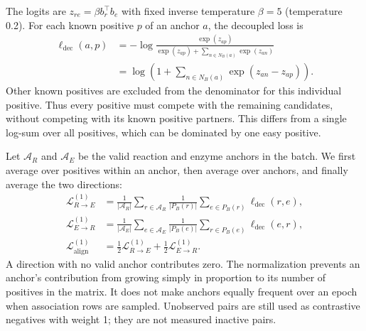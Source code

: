 The logits are $z_{re}=\beta b_r^\top b_e$ with fixed inverse temperature
$\beta=5$ (temperature 0.2). For each known positive $p$ of an anchor $a$, the
decoupled loss is
\begin{align}
  \ell_{\mathrm{dec}}(a,p)
   &=-\log\frac{\exp(z_{ap})}
       {\exp(z_{ap})+\sum_{n\in N_B(a)}\exp(z_{an})}\\
   &=\log\left(1+\sum_{n\in N_B(a)}\exp(z_{an}-z_{ap})\right).
   \label{eq:v4-decoupled}
\end{align}
Other known positives are excluded from the denominator for this individual
positive. Thus every positive must compete with the remaining candidates,
without competing with its known positive partners. This differs from a
single log-sum over all positives, which can be dominated by one easy positive.

Let $\mathcal A_R$ and $\mathcal A_E$ be the valid reaction and enzyme anchors
in the batch. We first average over positives within an anchor, then average
over anchors, and finally average the two directions:
\begin{align}
  \mathcal L_{R\to E}^{(1)}
    &=\frac{1}{|\mathcal A_R|}\sum_{r\in\mathcal A_R}
      \frac{1}{|P_B(r)|}\sum_{e\in P_B(r)}\ell_{\mathrm{dec}}(r,e),\\
  \mathcal L_{E\to R}^{(1)}
    &=\frac{1}{|\mathcal A_E|}\sum_{e\in\mathcal A_E}
      \frac{1}{|P_B(e)|}\sum_{r\in P_B(e)}\ell_{\mathrm{dec}}(e,r),\\
  \mathcal L_{\mathrm{align}}^{(1)}
    &=\tfrac12\mathcal L_{R\to E}^{(1)}+
      \tfrac12\mathcal L_{E\to R}^{(1)}.
  \label{eq:v4-anchor-balanced}
\end{align}
A direction with no valid anchor contributes zero. The normalization prevents
an anchor's contribution from growing simply in proportion to its number of
positives in the matrix. It does not make anchors equally frequent over an
epoch when association rows are sampled. Unobserved pairs are still used as
contrastive negatives with weight 1; they are not measured inactive pairs.

